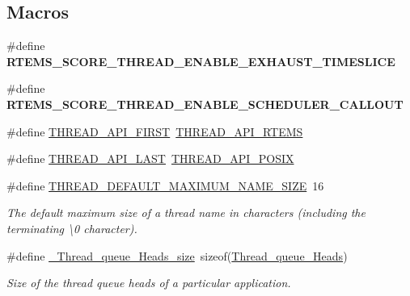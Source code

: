 \subsection*{Macros}
\begin{DoxyCompactItemize}
\item 
\mbox{\label{group__RTEMSScoreThread_ga999c7d8bffc09330eee98d784487132a}} 
\#define {\bfseries R\+T\+E\+M\+S\+\_\+\+S\+C\+O\+R\+E\+\_\+\+T\+H\+R\+E\+A\+D\+\_\+\+E\+N\+A\+B\+L\+E\+\_\+\+E\+X\+H\+A\+U\+S\+T\+\_\+\+T\+I\+M\+E\+S\+L\+I\+CE}
\item 
\mbox{\label{group__RTEMSScoreThread_ga26d92fbff0443c39af75e4ab458d6cda}} 
\#define {\bfseries R\+T\+E\+M\+S\+\_\+\+S\+C\+O\+R\+E\+\_\+\+T\+H\+R\+E\+A\+D\+\_\+\+E\+N\+A\+B\+L\+E\+\_\+\+S\+C\+H\+E\+D\+U\+L\+E\+R\+\_\+\+C\+A\+L\+L\+O\+UT}
\item 
\#define \mbox{\hyperlink{group__RTEMSScoreThread_gaa8beca1577c24c8107f1d30a0b5c1c4c}{T\+H\+R\+E\+A\+D\+\_\+\+A\+P\+I\+\_\+\+F\+I\+R\+ST}}~\mbox{\hyperlink{group__RTEMSScoreThread_ggaf87b9c0fbba9460ccb284584454c5280abe3da3f1c02de606c8ff1488564a0a73}{T\+H\+R\+E\+A\+D\+\_\+\+A\+P\+I\+\_\+\+R\+T\+E\+MS}}
\item 
\#define \mbox{\hyperlink{group__RTEMSScoreThread_gae9eede8eaa139d657213be4d38a5f756}{T\+H\+R\+E\+A\+D\+\_\+\+A\+P\+I\+\_\+\+L\+A\+ST}}~\mbox{\hyperlink{group__RTEMSScoreThread_ggaf87b9c0fbba9460ccb284584454c5280a643780b2fad6bb2de6b6688b2f2423cc}{T\+H\+R\+E\+A\+D\+\_\+\+A\+P\+I\+\_\+\+P\+O\+S\+IX}}
\item 
\#define \mbox{\hyperlink{group__RTEMSScoreThread_ga68e095a67ea3f48b97721e9c2be35a8a}{T\+H\+R\+E\+A\+D\+\_\+\+D\+E\+F\+A\+U\+L\+T\+\_\+\+M\+A\+X\+I\+M\+U\+M\+\_\+\+N\+A\+M\+E\+\_\+\+S\+I\+ZE}}~16
\begin{DoxyCompactList}\small\item\em The default maximum size of a thread name in characters (including the terminating \textquotesingle{}\textbackslash{}0\textquotesingle{} character). \end{DoxyCompactList}\item 
\#define \mbox{\hyperlink{group__RTEMSScoreThread_ga51a02e6653cabfda359b41cc391a7ae4}{\+\_\+\+Thread\+\_\+queue\+\_\+\+Heads\+\_\+size}}~sizeof(\mbox{\hyperlink{group__RTEMSScoreThreadQueue_gaebac32033b009cc8f606a90bd389f8e9}{Thread\+\_\+queue\+\_\+\+Heads}})
\begin{DoxyCompactList}\small\item\em Size of the thread queue heads of a particular application. \end{DoxyCompactList}\item 

\end{DoxyCompactItemize}
